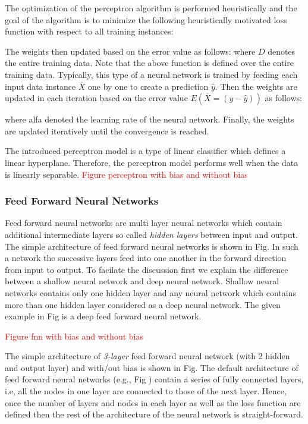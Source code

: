 The optimization of the perceptron algorithm is performed heuristically and the goal of the algorithm is to minimize the following heuristically motivated loss function with respect to all training instances:

The weights then updated based on the error value as follows:
where $D$ denotes the entire training data. Note that the above function is defined over the entire training data. Typically, this type of a neural network is trained by feeding each input data instance $\overline{X}$ one by one to create a prediction $\hat{y}$. Then the weights are updated in each iteration based on the error value $E(\overline{X} = (y-\hat{y}))$ as follows:

where alfa denoted the learning rate of the neural network. Finally, the weights are updated iteratively until the convergence is reached. 

The introduced perceptron model is a type of linear classifier which defines a linear hyperplane. Therefore, the perceptron model performs well when the data is linearly separable.
\textcolor{red}{Figure perceptron with bias and without bias}
\subsubsection{Feed Forward Neural Networks}
Feed forward neural networks are multi layer neural networks which contain additional intermediate layers so called \textit{hidden layers} between input and output. The simple architecture of feed forward neural networks is shown in Fig.
In such a network the successive layers feed into one another in the forward direction from input to output. To facilate the discussion first we explain the difference between a shallow neural network and deep neural network. Shallow neural networks contains only one hidden layer and any neural network which contains more than one hidden layer considered as a deep neural network. The given example in Fig is 
a deep feed forward neural network.

\textcolor{red}{Figure fnn with bias and without bias}

The simple architecture of \textit{3-layer} feed forward neural network (with 2 hidden and output layer) and with/out bias is shown in Fig. %
The default architecture of feed forward neural networks (e.g., Fig ) contain a series of fully connected layers, i.e, all the nodes in one layer are connected to those of the next layer. Hence, once the number of layers and nodes in each layer as well as the loss function are defined then the rest of the architecture of the neural network is straight-forward.

